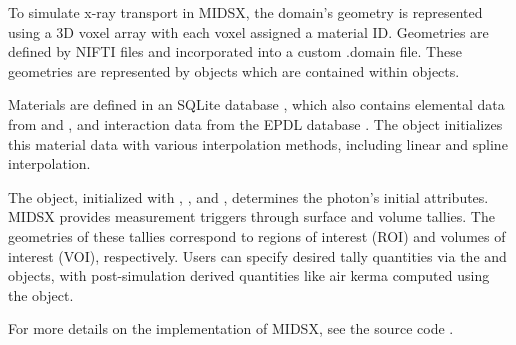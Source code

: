 \par To simulate x-ray transport in MIDSX, the domain's geometry is represented using a 3D voxel array with each voxel assigned a material ID. Geometries are defined by NIFTI files \cite{nifti2004} and incorporated into a custom .domain file. These geometries are represented by  objects which are contained within  objects.
\par Materials are defined in an SQLite database \cite{sqlite2020hipp}, which also contains elemental data from \cite{periodictable2022} and \cite{mendeleev2021}, and interaction data from the EPDL database \cite{cullen_survey_nodate}. The  object initializes this material data with various interpolation methods, including linear and spline interpolation.
\par The  object, initialized with , , and , determines the photon's initial attributes. MIDSX provides measurement triggers through surface and volume tallies. The geometries of these tallies correspond to regions of interest (ROI) and volumes of interest (VOI), respectively. Users can specify desired tally quantities via the  and  objects, with post-simulation derived quantities like air kerma computed using the  object.
\par For more details on the implementation of MIDSX, see the source code \cite{MIDSX2023}.



